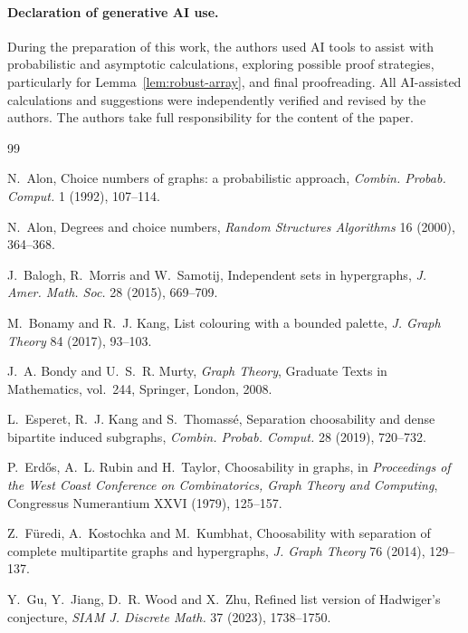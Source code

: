 \documentclass[12pt]{article}
\numberwithin{equation}{section}
\theoremstyle{definition}
\begin{document}
\paragraph{Declaration of generative AI use.} 

During the preparation of this work, the authors used AI tools to assist with probabilistic and asymptotic calculations, exploring possible proof strategies, particularly for Lemma~\ref{lem:robust-array}, and final proofreading. All AI-assisted calculations and suggestions were independently verified and revised by the authors. The authors take full responsibility for the content of the paper.

\begingroup
\small
\begin{thebibliography}{99}

N.~Alon,
\newblock Choice numbers of graphs: a probabilistic approach,
\newblock \emph{Combin. Probab. Comput.} 1 (1992), 107--114.

N.~Alon,
\newblock Degrees and choice numbers,
\newblock \emph{Random Structures Algorithms} 16 (2000), 364--368.

J.~Balogh, R.~Morris and W.~Samotij,
\newblock Independent sets in hypergraphs,
\newblock \emph{J. Amer. Math. Soc.} 28 (2015), 669--709.

M.~Bonamy and R.~J. Kang,
\newblock List colouring with a bounded palette,
\newblock \emph{J. Graph Theory} 84 (2017), 93--103.

J.~A. Bondy and U.~S.~R. Murty,
\newblock \emph{Graph Theory},
\newblock Graduate Texts in Mathematics, vol.~244, Springer, London, 2008.

L.~Esperet, R.~J. Kang and S.~Thomass\'e,
\newblock Separation choosability and dense bipartite induced subgraphs,
\newblock \emph{Combin. Probab. Comput.} 28 (2019), 720--732.

P.~Erd\H{o}s, A.~L. Rubin and H.~Taylor,
\newblock Choosability in graphs,
\newblock in \emph{Proceedings of the West Coast Conference on Combinatorics, Graph Theory and Computing}, Congressus Numerantium XXVI (1979), 125--157.

Z.~F\"uredi, A.~Kostochka and M.~Kumbhat,
\newblock Choosability with separation of complete multipartite graphs and hypergraphs,
\newblock \emph{J. Graph Theory} 76 (2014), 129--137.

Y.~Gu, Y.~Jiang, D.~R. Wood and X.~Zhu,
\newblock Refined list version of Hadwiger's conjecture,
\newblock \emph{SIAM J. Discrete Math.} 37 (2023), 1738--1750.


\end{thebibliography}
\end{document}
